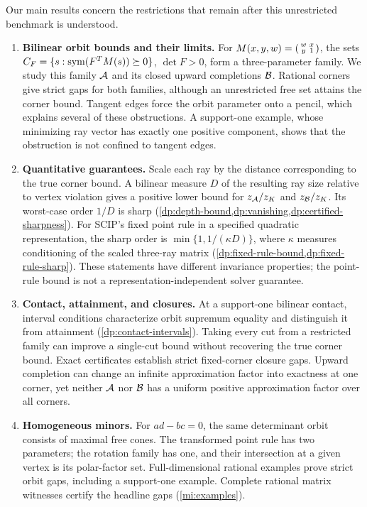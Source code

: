 Our main results concern the restrictions that remain after this
unrestricted benchmark is understood.

\begin{enumerate}
\item \textbf{Bilinear orbit bounds and their limits.}
For $M(x,y,w)=\begin{psmallmatrix}w&x\\y&1\end{psmallmatrix}$, the sets
$C_F=\{s:\operatorname{sym}(F^TM(s))\succeq0\}$, $\det F>0$, form a
three-parameter family. We study this family $\mathcal A$ and its closed
upward completions $\mathcal B$. Rational corners give strict gaps for both
families, although an unrestricted free set attains the corner bound.
Tangent edges force the orbit parameter onto a pencil, which explains
several of these obstructions. A support-one example, whose minimizing
ray vector has exactly one positive component, shows that the obstruction
is not confined to tangent edges.

\item \textbf{Quantitative guarantees.}
Scale each ray by the distance corresponding to the true corner bound.
A bilinear measure $D$ of the resulting ray size relative to vertex
violation gives a positive lower bound for $z_{\mathcal A}/z_K$ and $z_{\mathcal B}/z_K$.
Its worst-case order $1/D$ is sharp
(\cref{dp:depth-bound,dp:vanishing,dp:certified-sharpness}).
For SCIP's fixed point rule in a specified quadratic representation, the
sharp order is $\min\{1,1/(\kappa D)\}$, where $\kappa$ measures
conditioning of the scaled three-ray matrix
(\cref{dp:fixed-rule-bound,dp:fixed-rule-sharp}).
These statements have different invariance properties; the point-rule
bound is not a representation-independent solver guarantee.

\item \textbf{Contact, attainment, and closures.}
At a support-one bilinear contact, interval conditions characterize
orbit supremum equality and distinguish it from attainment
(\cref{dp:contact-intervals}). Taking every cut from a restricted family
can improve a single-cut bound without recovering the true corner
bound. Exact certificates establish strict fixed-corner closure gaps.
Upward completion can change an infinite approximation factor into
exactness at one corner, yet neither $\mathcal A$ nor $\mathcal B$ has a uniform
positive approximation factor over all corners.

\item \textbf{Homogeneous minors.}
For $ad-bc=0$, the same determinant orbit consists of maximal free cones.
The transformed point rule has two parameters; the rotation family has
one, and their intersection at a given vertex is its polar-factor set.
Full-dimensional rational examples prove strict orbit gaps, including a
support-one example. Complete rational matrix witnesses certify the
headline gaps (\cref{mi:examples}).


\end{enumerate}
